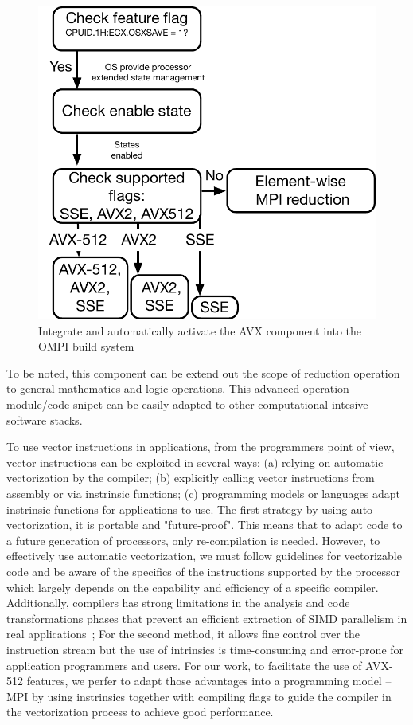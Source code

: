 \documentclass[sigconf]{acmart}
\begin{document}
\begin{figure}[h]
    \centering
    \includegraphics[scale=.45]{avx-graph.pdf}
    \caption{Integrate and automatically activate the AVX component into the OMPI build system}
    \label{fig:512flow}
\end{figure}

To be noted, this component can be
extend out the scope of reduction operation to general mathematics and logic operations.
This advanced operation module/code-snipet can be easily adapted to other computational intesive software stacks.

To use vector instructions in applications, from the programmers point of view,
vector instructions can be exploited in several ways: (a) relying on automatic vectorization by the
compiler; (b) explicitly calling vector
instructions from assembly or via instrinsic functions; (c) programming models or languages adapt
instrinsic functions for applications to use.
The first strategy by using auto-vectorization,
it is portable and "future-proof". This means that to adapt code to a future generation of processors, only re-compilation
is needed. However, to effectively use automatic vectorization, we must follow
guidelines for vectorizable code and be aware of the specifics of the instructions supported
by the processor which largely depends on the capability and efficiency of a specific compiler.
Additionally, compilers has strong limitations in the analysis and code transformations phases
that prevent an efficient extraction of SIMD parallelism in real applications~\cite{auto_Evaluation};
For the second method, it allows fine control over the instruction stream but the use of
intrinsics is time-consuming and error-prone for application programmers and users.
For our work, to facilitate the use of AVX-512 features, we
perfer to adapt those advantages into a programming model --  MPI by using
instrinsics together with compiling flags
to guide the compiler in the vectorization process to achieve good performance.
\end{document}
